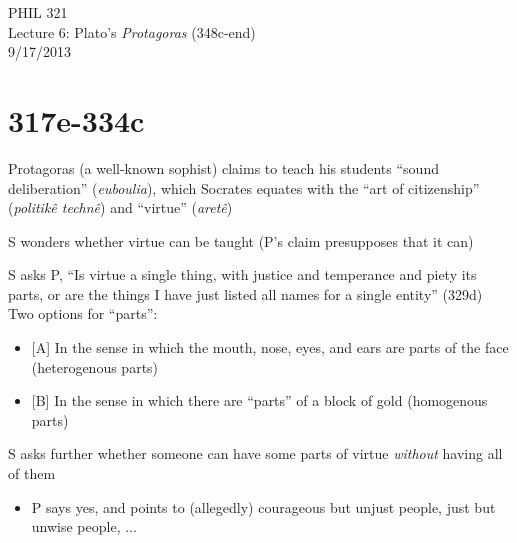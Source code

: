 \documentclass[11pt]{article}
\begin{document}
\thispagestyle{empty}
\begin{center} \LARGE{PHIL 321\\ Lecture 6: Plato's \emph{Protagoras} (348c-end)}\\ \vspace*{2mm}
\large{9/17/2013}\end{center}
\thispagestyle{empty}\vspace*{3mm}
\vspace*{-8mm}

\section*{317e-334c}

\noindent Protagoras (a well-known sophist) claims to teach his students ``sound deliberation'' (\emph{euboulia}), which Socrates equates with the ``art of citizenship'' (\emph{politik\^{e} techn\^{e}}) and ``virtue'' (\emph{aret\^{e}})
\vspace*{2mm}

\noindent S wonders whether virtue can be taught (P's claim presupposes that it can)
\vspace*{2mm}

\noindent S asks P, ``Is virtue a single thing, with justice and temperance and piety its parts, or are the things I have just listed all names for a single entity'' (329d) Two options for ``parts'':
\vspace*{2mm}

\begin{itemize}\item{[A] In the sense in which the mouth, nose, eyes, and ears are parts of the face (heterogenous parts)}\item{[B] In the sense in which there are ``parts'' of a block of gold (homogenous parts)}\end{itemize}
\vspace*{2mm}

\noindent S asks further whether someone can have some parts of virtue \emph{without} having all of them
\begin{itemize}
\item{P says yes, and points to (allegedly) courageous but unjust people, just but unwise people, ...}\end{itemize}
\end{document}
